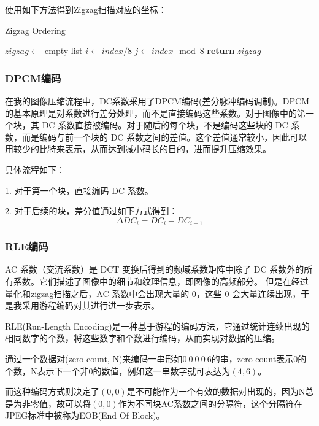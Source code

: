 \documentclass{article}
\begin{document}
使用如下方法得到Zigzag扫描对应的坐标：
\FloatBarrier
\begin{algorithm}
    \caption{Zigzag Ordering}
    \begin{algorithmic}[1]
    \State $zigzag \gets$ empty list
        \State $i \gets index / 8$  
        \State $j \gets index \mod 8$ 
        \State {}  
    \EndFor
    \State \textbf{return} $zigzag$
    \EndProcedure
    \end{algorithmic}
\end{algorithm}
\FloatBarrier

\subsubsection{DPCM编码}

在我的图像压缩流程中，DC系数采用了DPCM编码(差分脉冲编码调制)。DPCM 的基本原理是对系数进行差分处理，而不是直接编码这些系数。对于图像中的第一个块，其 DC 系数直接被编码。对于随后的每个块，不是编码这些块的 DC 系数，而是编码与前一个块的 DC 系数之间的差值。这个差值通常较小，因此可以用较少的比特来表示，从而达到减小码长的目的，进而提升压缩效果。

具体流程如下：

1. 对于第一个块，直接编码 DC 系数。

2. 对于后续的块，差分值通过如下方式得到：\[\Delta DC_i=DC_i-DC_{i-1}\]

\subsubsection{RLE编码}

AC 系数（交流系数）是 DCT 变换后得到的频域系数矩阵中除了 DC 系数外的所有系数。它们描述了图像中的细节和纹理信息，即图像的高频部分。
但是在经过量化和zigzag扫描之后，AC 系数中会出现大量的 0，这些 0 会大量连续出现，于是我采用游程编码对其进行进一步表示。

RLE(Run-Length Encoding)是一种基于游程的编码方法，它通过统计连续出现的相同数字的个数，将这些数字和个数进行编码，从而实现对数据的压缩。

通过一个数据对(zero count, N)来编码一串形如$0\ 0\ 0\ 0\ 6$的串，zero count表示0的个数，N表示下一个非0的数值，例如这一串数字就可表达为$(4, 6)$。

而这种编码方式则决定了$(0,0)$是不可能作为一个有效的数据对出现的，因为N总是为非零值，故可以将$(0,0)$作为不同块AC系数之间的分隔符，这个分隔符在JPEG标准中被称为EOB(End Of Block)。
\end{document}
